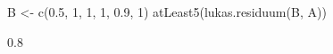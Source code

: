 \begin{Schunk}
% --begin: "quant3"
\begin{Sinput}
 B <- c(0.5, 1, 1, 1, 0.9, 1)
 atLeast5(lukas.residuum(B, A))
\end{Sinput}
\begin{Soutput}
[1] 0.8
\end{Soutput}
%
% --end: "quant3"
\end{Schunk}
